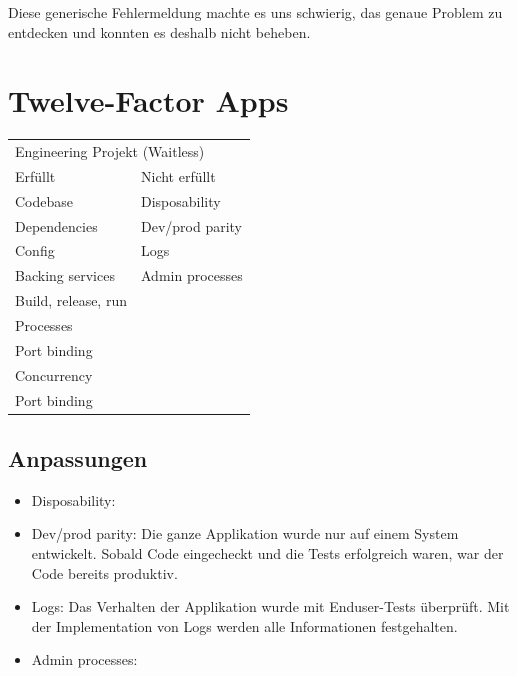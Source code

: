 \documentclass[12pt,a4paper]{article}
\begin{document}
Diese generische Fehlermeldung machte es uns schwierig, das genaue Problem zu entdecken und konnten es deshalb nicht beheben.



\section{Twelve-Factor Apps}
    \begin{table}[h]
        \begin{tabular}{ll}
        \multicolumn{2}{l}{Engineering Projekt (Waitless)} \\
        Erfüllt               & Nicht erfüllt              \\
        Codebase              & Disposability              \\
        Dependencies          & Dev/prod parity            \\
        Config                & Logs                       \\
        Backing services      & Admin processes            \\
        Build, release, run   &                            \\
        Processes             &                            \\
        Port binding          &                            \\
        Concurrency           &                            \\
        Port binding          &                            \\
        \end{tabular}
    \end{table}

\subsection{Anpassungen}
    \begin{itemize}
        \item Disposability:
        \item Dev/prod parity: Die ganze Applikation wurde nur auf einem System entwickelt. Sobald Code eingecheckt und die Tests
              erfolgreich waren, war der Code bereits produktiv.
        \item Logs: Das Verhalten der Applikation wurde mit Enduser-Tests überprüft. Mit der Implementation von Logs werden alle
              Informationen festgehalten.
        \item Admin processes:
    \end{itemize}
\end{document}
